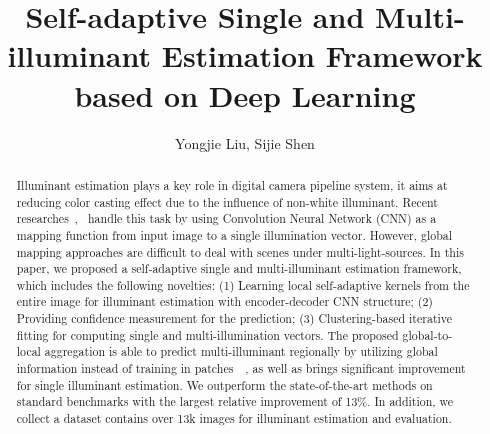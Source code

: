 \documentclass[10pt,twocolumn,letterpaper]{article}
\begin{document}
\title{Self-adaptive Single and Multi-illuminant Estimation Framework \\
based on Deep Learning}

\author{Yongjie Liu, Sijie Shen
}


\maketitle

\begin{abstract}
  Illuminant estimation plays a key role in digital camera pipeline system,
  it aims at reducing color casting effect due to the influence of non-white illuminant.
  Recent researches~\cite{shi2016deep},~\cite{hu2017fc} handle this task by
  using Convolution Neural Network (CNN) as a mapping function from input image to a single illumination vector.
  However, global mapping approaches are difficult to deal with scenes under multi-light-sources.
  In this paper, we proposed a self-adaptive single and multi-illuminant estimation framework,
  which includes the following novelties:
  (1) Learning local self-adaptive kernels from the entire image for illuminant estimation with encoder-decoder CNN structure;
  (2) Providing confidence measurement for the prediction;
  (3) Clustering-based iterative fitting for computing single and multi-illumination vectors.
  The proposed global-to-local aggregation is able to predict multi-illuminant regionally by utilizing
  global information instead of training in patches~\cite{bianco2015single}~\cite{gijsenij2012color},
  as well as brings significant improvement for single illuminant estimation.
  We outperform the state-of-the-art methods on standard benchmarks with the largest relative improvement of 13\%.
  In addition, we collect a dataset contains over 13k images for illuminant estimation and evaluation.
\end{abstract}
\end{document}
